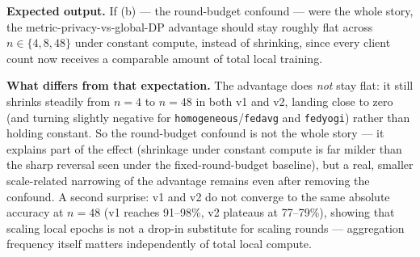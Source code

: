 \documentclass[11pt]{article}
\newcommand{\code}[1]{\texttt{#1}}
\begin{document}
\noindent \textbf{Expected output.} If (b) --- the round-budget confound --- were the whole story,
the metric-privacy-vs-global-DP advantage should stay roughly flat across $n \in \{4,8,48\}$ under
constant compute, instead of shrinking, since every client count now receives a comparable amount
of total local training.

\noindent \textbf{What differs from that expectation.} The advantage does \emph{not} stay flat: it
still shrinks steadily from $n{=}4$ to $n{=}48$ in both v1 and v2, landing close to zero (and
turning slightly negative for \code{homogeneous}/\code{fedavg} and \code{fedyogi}) rather than
holding constant. So the round-budget confound is not the whole story --- it explains part of the
effect (shrinkage under constant compute is far milder than the sharp reversal seen under the
fixed-round-budget baseline), but a real, smaller scale-related narrowing of the advantage remains
even after removing the confound. A second surprise: v1 and v2 do not converge to the same absolute
accuracy at $n{=}48$ (v1 reaches 91--98\%, v2 plateaus at 77--79\%), showing that scaling local
epochs is not a drop-in substitute for scaling rounds --- aggregation frequency itself matters
independently of total local compute.
\end{document}
